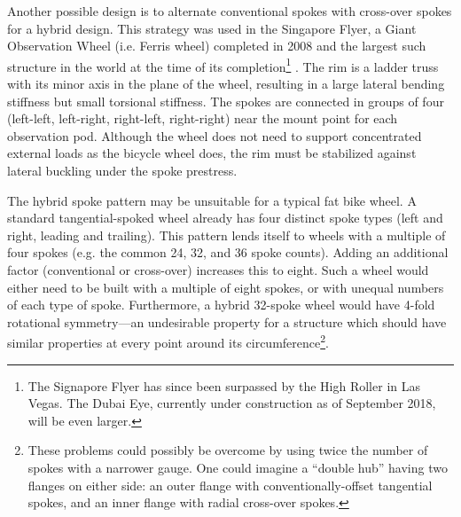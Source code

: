 \documentclass[\rootdir/thesis.tex]{subfiles}
\begin{document}
Another possible design is to alternate conventional spokes with cross-over spokes for a hybrid design. This strategy was used in the Singapore Flyer, a Giant Observation Wheel (i.e. Ferris wheel) completed in 2008 and the largest such structure in the world at the time of its completion\footnote{The Signapore Flyer has since been surpassed by the High Roller in Las Vegas. The Dubai Eye, currently under construction as of September 2018, will be even larger.} \cite{Allsop2009}. The rim is a ladder truss with its minor axis in the plane of the wheel, resulting in a large lateral bending stiffness but small torsional stiffness. The spokes are connected in groups of four (left-left, left-right, right-left, right-right) near the mount point for each observation pod. Although the wheel does not need to support concentrated external loads as the bicycle wheel does, the rim must be stabilized against lateral buckling under the spoke prestress.

The hybrid spoke pattern may be unsuitable for a typical fat bike wheel. A standard tangential-spoked wheel already has four distinct spoke types (left and right, leading and trailing). This pattern lends itself to wheels with a multiple of four spokes (e.g. the common 24, 32, and 36 spoke counts). Adding an additional factor (conventional or cross-over) increases this to eight. Such a wheel would either need to be built with a multiple of eight spokes, or with unequal numbers of each type of spoke. Furthermore, a hybrid 32-spoke wheel would have 4-fold rotational symmetry---an undesirable property for a structure which should have similar properties at every point around its circumference\footnote{These problems could possibly be overcome by using twice the number of spokes with a narrower gauge. One could imagine a ``double hub'' having two flanges on either side: an outer flange with conventionally-offset tangential spokes, and an inner flange with radial cross-over spokes.}.

\end{document}
